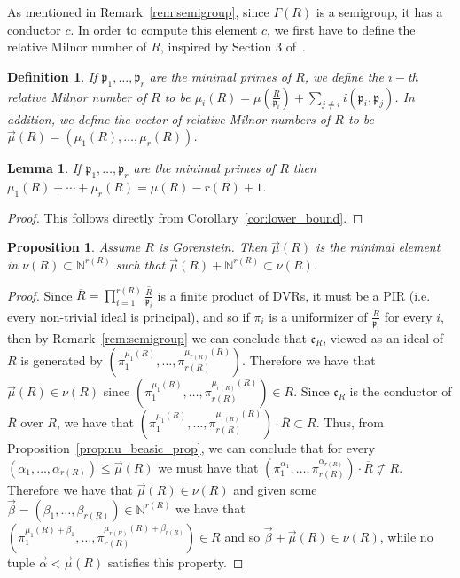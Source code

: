 \documentclass{article}
\newtheorem{definition}[theorem]{Definition}
\newtheorem{lemma}[theorem]{Lemma}
\newtheorem{proposition}[theorem]{Proposition}
\numberwithin{theorem}{section}
\begin{document}
As mentioned in Remark~\ref{rem:semigroup}, since $\Gamma(R)$ is a semigroup, it has a conductor $c$. In  order to compute this element $c$, we first have to define the relative Milnor number of $R$, inspired by Section 3 of~\cite{ploski1995milnor}. 

\begin{definition}\label{def:RelMIlnor}
    If $\mathfrak{p}_1, \dots, \mathfrak{p}_r$ are the minimal primes of $R$, we define the $i-$th relative Milnor number of $R$ to be $\mu_i(R)=\mu\left(\frac{R}{\mathfrak{p}_i}\right) + \sum_{j \neq i} i(\mathfrak{p}_i, \mathfrak{p}_j)$. In addition, we define the vector of relative Milnor numbers of $R$ to be $\vec{\mu}(R)=(\mu_1(R), \dots, \mu_r(R))$. 
\end{definition}

\begin{lemma}\label{lem:vec_mu_sum}
    If $\mathfrak{p}_1, \dots, \mathfrak{p}_r$ are the minimal primes of $R$ then $\mu_1(R)+\cdots+\mu_r(R)=\mu(R)-r(R)+1$. 
\end{lemma}

\begin{proof}
    This follows directly from Corollary~\ref{cor:lower_bound}. 
\end{proof}


\begin{proposition}\label{prop:mu_vec}
    Assume $R$ is Gorenstein. Then $\vec{\mu}(R)$ is the minimal element in $\nu(R) \subset \mathbb{N}^{r(R)}$ such that $\vec{\mu}(R) + \mathbb{N}^{r(R)} \subset \nu(R)$. 
\end{proposition}

\begin{proof}
 Since $\overline{R} = \prod_{i=1}^{r(R)} \overline{\frac{R}{\mathfrak{p}_i}}$ is a finite product of DVRs, it must be a PIR (i.e. every non-trivial ideal is principal), and so if $\pi_i$ is a uniformizer of $\overline{\frac{R}{\mathfrak{p}_i}}$ for every $i$, then by Remark~\ref{rem:semigroup} we can conclude that $\mathfrak{c}_R$, viewed as an ideal of $\overline{R}$ is generated by $(\pi_1^{\mu_1(R)}, \dots, \pi_{r(R)}^{\mu_{r(R)}(R)})$. Therefore we have that $\vec{\mu}(R) \in \nu(R)$ since $(\pi_1^{\mu_1(R)}, \dots, \pi_{r(R)}^{\mu_{r(R)}(R)}) \in R$. Since $\mathfrak{c}_R$ is the conductor of $\overline{R}$ over $R$, we have that $(\pi_1^{\mu_1(R)}, \dots, \pi_{r(R)}^{\mu_{r(R)}(R)}) \cdot \overline{R} \subset R$. Thus, from Proposition~\ref{prop:nu_beasic_prop}, we can conclude that for every $(\alpha_1, \dots, \alpha_{r(R)}) \leq \vec{\mu}(R)$ we must have that $(\pi_1^{\alpha_1}, \dots, \pi_{r(R)}^{\alpha_{r(R)}}) \cdot \overline{R} \not\subset R$. Therefore we have that $\vec{\mu}(R) \in \nu(R)$ and given some $\vec{\beta}=(\beta_1, \dots, \beta_{r(R)}) \in \mathbb{N}^{r(R)}$ we have that $(\pi_1^{\mu_1(R)+\beta_1}, \dots, \pi_{r(R)}^{\mu_{r(R)}(R)+\beta_{r(R)}}) \in R$ and so $\vec{\beta}+\vec{\mu}(R) \in \nu(R)$, while no tuple $\vec{\alpha} < \vec{\mu}(R)$ satisfies this property. 
\end{proof}
\end{document}
